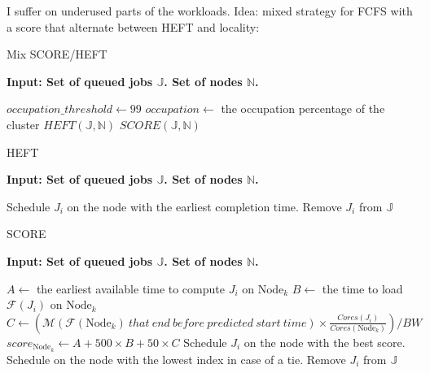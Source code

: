 \documentclass[a4paper]{article}
\newcommand{\Node}[1]{\ensuremath{\mathrm{Node}_{#1}}\xspace}
\newcommand{\inputs}{\ensuremath{\mathcal{F}}\xspace}
\newcommand{\memory}{\ensuremath{\mathcal{M}}\xspace}
\newcommand{\bandwidth}{\mathit{BW}\xspace}
\newcommand{\core}{\mathit{Cores}\xspace}
\newcommand{\jobset}{\ensuremath{\mathbb{J}}\xspace}
\newcommand{\nodeset}{\ensuremath{\mathbb{N}}\xspace}
\begin{document}
I suffer on underused parts of the workloads. Idea: mixed strategy for FCFS with a score that alternate between HEFT and locality:\\
\begin{algorithm}[htbp]
\caption{Mix SCORE/HEFT}
\hspace*{\algorithmicindent} \textbf{Input: Set of queued jobs $\jobset$. Set of nodes $\nodeset$.} \\
\begin{algorithmic}[0]
\State $occupation\_threshold \gets 99$ 
\State $occupation \gets$ the occupation percentage of the cluster 
\ForEach {$J_i \in \jobset$}
		\State $HEFT(\jobset,\nodeset)$
	\Else
		\State $SCORE(\jobset,\nodeset)$
	\EndIf
\EndFor
\end{algorithmic}
\end{algorithm}

\begin{algorithm}[htbp]
\caption{HEFT}
\hspace*{\algorithmicindent} \textbf{Input: Set of queued jobs $\jobset$. Set of nodes $\nodeset$.} \\
\begin{algorithmic}[0]
\ForEach {$J_i \in \jobset$}
	\State Schedule $J_i$ on the node with the earliest completion time. 
	\State Remove $J_i$ from $\jobset$
\EndFor
\end{algorithmic}
\end{algorithm}

\begin{algorithm}[htbp]
\caption{SCORE}
\hspace*{\algorithmicindent} \textbf{Input: Set of queued jobs $\jobset$. Set of nodes $\nodeset$.} \\
\begin{algorithmic}[0]
\ForEach {$J_i \in \jobset$}
	\ForEach {$\Node{k} \in \nodeset$}
		\State $A \gets$ the earliest available time to compute $J_i$ on $\Node{k}$
		\State $B \gets$ the time to load $\inputs(J_i)$ on $\Node{k}$ 
		\State $C \gets (\memory(\inputs(\Node{k})~that~end~before~predicted~start~time) \times \frac{\core(J_i)}{\core(\Node{k})})/\bandwidth$
		\State $score_{\Node{k}} \gets A + 500 \times B + 50 \times C$
	\EndFor
	\State Schedule $J_i$ on the node with the best score. Schedule on the node with the lowest index in case of a tie.
	\State Remove $J_i$ from $\jobset$
\EndFor
\end{algorithmic}
\end{algorithm}
\end{document}
